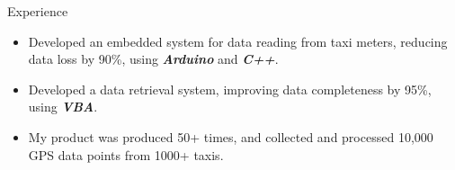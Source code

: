 \documentclass{resume} %
\begin{document}
\begin{workSection}{Experience}
      \experienceItem[
      company=Ministry of Transportation and Communications TW \& NCTU,
      location=Taipei{,} TW,
      position=Embedded System Engineer,
      duration=June 2016 – Sep. 2016
      ]
      \vspace{-0.65em}
      \begin{itemize}
            \itemsep -6pt {}
            \item Developed an embedded system for data reading from taxi meters, reducing data loss by 90\%, using \textit{\textbf{Arduino}} and \textit{\textbf{C++}}.
            \item Developed a data retrieval system, improving data completeness by 95\%, using \textit{\textbf{VBA}}.
            \item My product was produced 50+ times, and collected and processed 10,000 GPS data points from 1000+ taxis.
      \end{itemize}

\end{workSection}

\education{
\educationItem[
university=National Chiao Tung University (NCTU),
location=Hsinchu{,} TW,
program=B.S.{,} Computer Science,
graduation=2018
]
}
\end{document}
